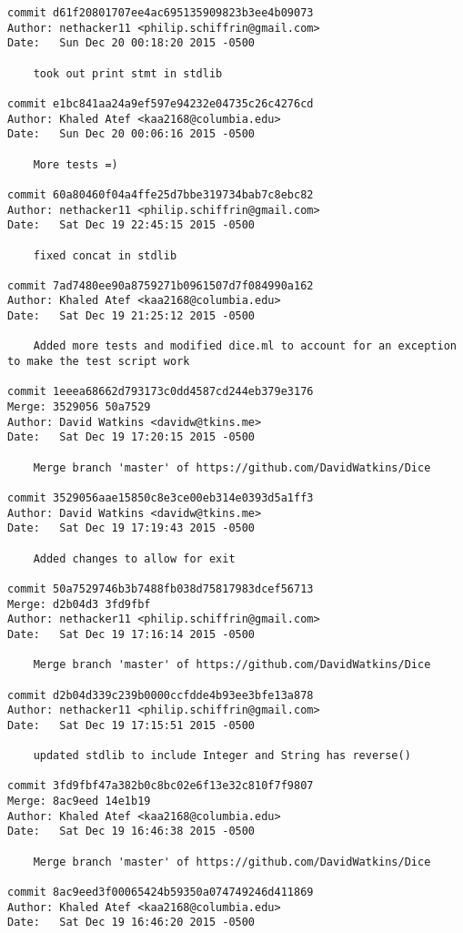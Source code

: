 \begin{verbatim}
commit d61f20801707ee4ac695135909823b3ee4b09073
Author: nethacker11 <philip.schiffrin@gmail.com>
Date:   Sun Dec 20 00:18:20 2015 -0500

    took out print stmt in stdlib

commit e1bc841aa24a9ef597e94232e04735c26c4276cd
Author: Khaled Atef <kaa2168@columbia.edu>
Date:   Sun Dec 20 00:06:16 2015 -0500

    More tests =)

commit 60a80460f04a4ffe25d7bbe319734bab7c8ebc82
Author: nethacker11 <philip.schiffrin@gmail.com>
Date:   Sat Dec 19 22:45:15 2015 -0500

    fixed concat in stdlib

commit 7ad7480ee90a8759271b0961507d7f084990a162
Author: Khaled Atef <kaa2168@columbia.edu>
Date:   Sat Dec 19 21:25:12 2015 -0500

    Added more tests and modified dice.ml to account for an exception to make the test script work

commit 1eeea68662d793173c0dd4587cd244eb379e3176
Merge: 3529056 50a7529
Author: David Watkins <davidw@tkins.me>
Date:   Sat Dec 19 17:20:15 2015 -0500

    Merge branch 'master' of https://github.com/DavidWatkins/Dice

commit 3529056aae15850c8e3ce00eb314e0393d5a1ff3
Author: David Watkins <davidw@tkins.me>
Date:   Sat Dec 19 17:19:43 2015 -0500

    Added changes to allow for exit

commit 50a7529746b3b7488fb038d75817983dcef56713
Merge: d2b04d3 3fd9fbf
Author: nethacker11 <philip.schiffrin@gmail.com>
Date:   Sat Dec 19 17:16:14 2015 -0500

    Merge branch 'master' of https://github.com/DavidWatkins/Dice

commit d2b04d339c239b0000ccfdde4b93ee3bfe13a878
Author: nethacker11 <philip.schiffrin@gmail.com>
Date:   Sat Dec 19 17:15:51 2015 -0500

    updated stdlib to include Integer and String has reverse()

commit 3fd9fbf47a382b0c8bc02e6f13e32c810f7f9807
Merge: 8ac9eed 14e1b19
Author: Khaled Atef <kaa2168@columbia.edu>
Date:   Sat Dec 19 16:46:38 2015 -0500

    Merge branch 'master' of https://github.com/DavidWatkins/Dice

commit 8ac9eed3f00065424b59350a074749246d411869
Author: Khaled Atef <kaa2168@columbia.edu>
Date:   Sat Dec 19 16:46:20 2015 -0500


\end{verbatim}
